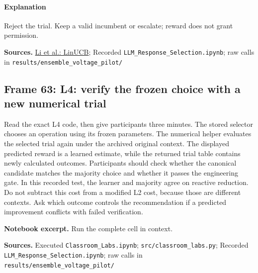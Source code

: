 \documentclass[11pt]{article}
\begin{document}
\paragraph{Explanation}Reject the trial. Keep a valid incumbent or escalate; reward does not grant permission.
\par\nopagebreak\begin{minipage}{\linewidth}{\footnotesize\color{slate}\textbf{Sources.} \href{https://arxiv.org/abs/1003.0146}{Li et al.: LinUCB}; Recorded \texttt{LLM\_Response\_Selection.ipynb}; raw calls in \texttt{results/ensemble\_voltage\_pilot/}\par}\end{minipage}\par\medskip
\subsection*{Frame 63: L4: verify the frozen choice with a new numerical trial}
Read the exact L4 code, then give participants three minutes. The stored selector chooses an operation using its frozen parameters. The numerical helper evaluates the selected trial again under the archived original context. The displayed predicted reward is a learned estimate, while the returned trial table contains newly calculated outcomes. Participants should check whether the canonical candidate matches the majority choice and whether it passes the engineering gate. In this recorded test, the learner and majority agree on reactive reduction. Do not subtract this cost from a modified L2 cost, because those are different contexts. Ask which outcome controls the recommendation if a predicted improvement conflicts with failed verification.\par
\par\noindent\begin{minipage}{\linewidth}\textbf{Notebook excerpt.} Run the complete cell in context.\par \end{minipage}\par
\par\nopagebreak\begin{minipage}{\linewidth}{\footnotesize\color{slate}\textbf{Sources.} Executed \texttt{Classroom\_Labs.ipynb}; \texttt{src/classroom\_labs.py}; Recorded \texttt{LLM\_Response\_Selection.ipynb}; raw calls in \texttt{results/ensemble\_voltage\_pilot/}\par}\end{minipage}\par\medskip
\end{document}
